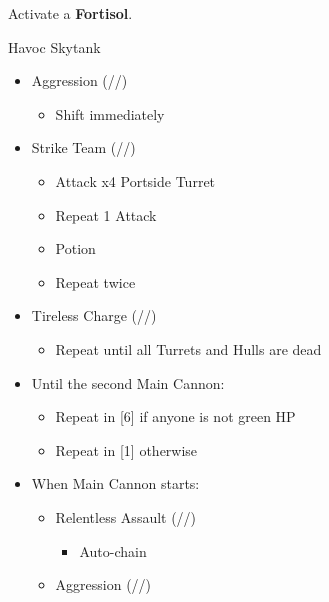 \begin{paracol}{2}
	\renewcommand{\first}{[1] Aggression (\com/\com/\rav)}
	\renewcommand{\second}{[2] Relentless Assault (\rav/\com/\rav)}
	\renewcommand{\third}{[3] Aggression (\com/\com/\rav)}
	\renewcommand{\fourth}{[4] Tireless Charge (\com/\com/\med)}
	\renewcommand{\fifth}{[5] Strike Team (\com/\com/\syn)}
	\renewcommand{\sixth}{[6] Tireless Charge (\com/\com/\med)}
	\switchcolumn*
	Activate a \textbf{Fortisol}.

	\begin{battle}{Havoc Skytank}
		\begin{itemize}
			\item \first
			      \begin{itemize}
				      \item Shift immediately
			      \end{itemize}
			\item \fifth
			      \begin{itemize}
				      \item Attack x4 Portside Turret
				      \item Repeat 1 Attack
				      \item Potion
				      \item Repeat twice
			      \end{itemize}
			\item \sixth
			      \begin{itemize}
				      \item Repeat until all Turrets and Hulls are dead
			      \end{itemize}
			\item Until the second Main Cannon:
			      \begin{itemize}
				      \item Repeat in [6] if anyone is not green HP
				      \item Repeat in [1] otherwise
			      \end{itemize}
			\item When Main Cannon starts:
			      \begin{itemize}
				      \item \begin{flushleft} \second \end{flushleft}
				            \begin{itemize}
					            \item Auto-chain
				            \end{itemize}
				      \item \first
				            \begin{itemize}

\end{itemize}
\end{itemize}
\end{itemize}
\end{battle}
\end{paracol}
